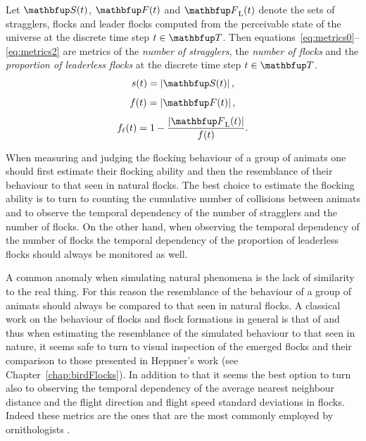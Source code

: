 \begin{definition}
\label{def:metrics}
Let $\set{S}(t)$, $\set{F}(t)$ and $\set{F}_\textnormal{L}(t)$ denote the sets of stragglers, flocks and leader flocks computed from the perceivable state of the universe at the discrete time step $t \in \set{T}$. Then equations~\eqref{eq:metrics0}--\eqref{eq:metrics2} are metrics of the \emph{number of stragglers}, the \emph{number of flocks} and the \emph{proportion of leaderless flocks} at the discrete time step $t \in \set{T}$.
\begin{equation}
s(t)=\left|\set{S}(t)\right|, \label{eq:metrics0}
\end{equation}
\vspace*{-6mm}
\begin{equation}
f(t)=\left|\set{F}(t)\right|,
\end{equation}
\vspace*{-2mm}
\begin{equation}
f_\ell(t)=1-\frac{\left|\set{F}_\textnormal{L}(t)\right|}{f(t)}. \label{eq:metrics2}
\end{equation}
\end{definition}

When measuring and judging the flocking behaviour of a group of animats one should first estimate their flocking ability and then the resemblance of their behaviour to that seen in natural flocks. The best choice to estimate the flocking ability is to turn to counting the cumulative number of collisions between animats and to observe the temporal dependency of the number of stragglers and the number of flocks.  On the other hand, when observing the temporal dependency of the number of flocks the temporal dependency of the proportion of leaderless flocks should always be monitored as well.

A common anomaly when simulating natural phenomena is the lack of similarity to the real thing. For this reason the resemblance of the behaviour of a group of animats should always be compared to that seen in natural flocks. A classical work on the behaviour of flocks and flock formations in general is that of  and thus when estimating the resemblance of the simulated behaviour to that seen in nature, it seems safe to turn to visual inspection of the emerged flocks and their comparison to those presented in Heppner's work (see Chapter~\ref{chap:birdFlocks}). In addition to that it seems the best option to turn also to observing the temporal dependency of the average nearest neighbour distance and the flight direction and flight speed standard deviations in flocks. Indeed these metrics are the ones that are the most commonly employed by ornithologists \cite{gould:1974,heppner:1985,pomeroy:1992}.

